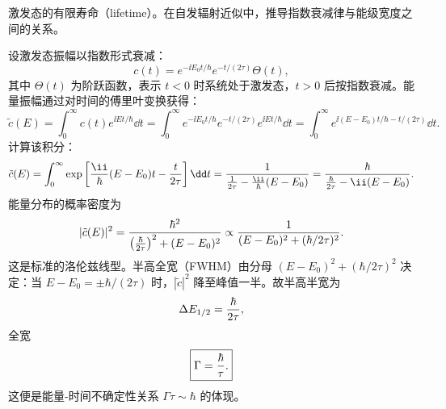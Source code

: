 \begin{question}
激发态的有限寿命（lifetime）。在自发辐射近似中，推导指数衰减律与能级宽度之间的关系。
\end{question}
\begin{solution}
设激发态振幅以指数形式衰减：
\[
c(t)=e^{-\ii E_0t/\hbar}e^{-t/(2\tau)}\Theta(t),
\]
其中 $\Theta(t)$ 为阶跃函数，表示 $t<0$ 时系统处于激发态，$t>0$ 后按指数衰减。能量振幅通过对时间的傅里叶变换获得：
\[
\tilde c(E)=\int_0^\infty c(t)e^{\ii Et/\hbar}\dd t
=\int_0^\infty e^{-\ii E_0t/\hbar}e^{-t/(2\tau)}e^{\ii Et/\hbar}\dd t
=\int_0^\infty e^{\ii(E-E_0)t/\hbar-t/(2\tau)}\dd t.
\]
计算该积分：
\[
\tilde c(E)=\int_0^\infty
\exp\left[{\ii\over\hbar}(E-E_0)t-{t\over2\tau}\right]\dd t
={1\over{1\over2\tau}-{\ii\over\hbar}(E-E_0)}
={\hbar\over{\hbar\over2\tau}-\ii(E-E_0)}.
\]
能量分布的概率密度为
\[
|\tilde c(E)|^2={\hbar^2\over\left({\hbar\over2\tau}\right)^2+(E-E_0)^2}
\propto{1\over(E-E_0)^2+(\hbar/2\tau)^2}.
\]
这是标准的洛伦兹线型。半高全宽（FWHM）由分母 $(E-E_0)^2+(\hbar/2\tau)^2$ 决定：当 $E-E_0=\pm\hbar/(2\tau)$ 时，$|\tilde c|^2$ 降至峰值一半。故半高半宽为
\[
\Delta E_{1/2}={\hbar\over2\tau},
\]
全宽
\[
\boxed{\Gamma={\hbar\over\tau}.}
\]
这便是能量-时间不确定性关系 $\Gamma\tau\sim\hbar$ 的体现。
\end{solution}

